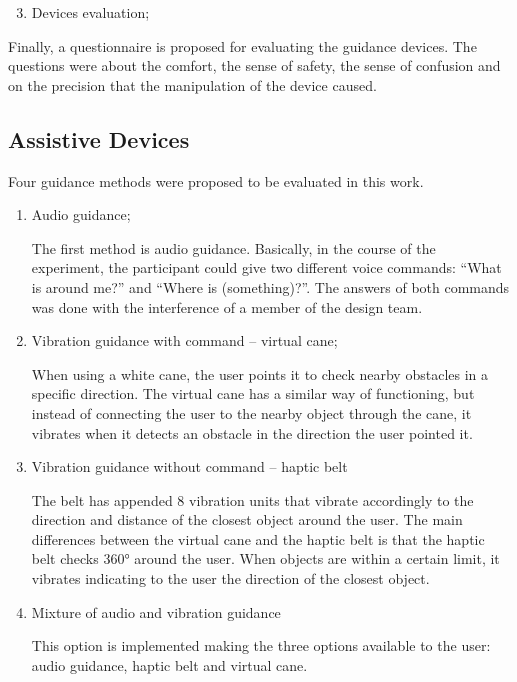     \begin{enumerate} [label = \Alph*)]
        \setcounter{enumi}{2}
        \item Devices evaluation;
    \end{enumerate}

    Finally, a questionnaire is proposed for evaluating the guidance devices. The questions were about the comfort, the sense of safety, the sense of confusion and on the precision that the manipulation of the device caused.

    \subsection*{Assistive Devices}
    Four guidance methods were proposed to be evaluated in this work.
        
    \begin{enumerate} [label = \Alph*)]
        \item Audio guidance;
        
        The first method is audio guidance. Basically, in the course of the experiment, the participant could give two different voice commands: “What is around me?” and “Where is (something)?”. The answers of both commands was done with the interference of a member of the design team.  

        \item Vibration guidance with command – virtual cane;
        
        When using a white cane, the user points it to check nearby obstacles in a specific direction. The virtual cane has a similar way of functioning, but instead of connecting the user to the nearby object through the cane, it vibrates when it detects an obstacle in the direction the user pointed it.

        \item Vibration guidance without command – haptic belt
        
        The belt has appended 8 vibration units that vibrate accordingly to the direction and distance of the closest object around the user. The main differences between the virtual cane and the haptic belt is that the haptic belt checks 360° around the user. When objects are within a certain limit, it vibrates indicating to the user the direction of the closest object. 

        \item Mixture of audio and vibration guidance
        
        This option is implemented making the three options available to the user: audio guidance, haptic belt and virtual cane. 
    \end{enumerate}


